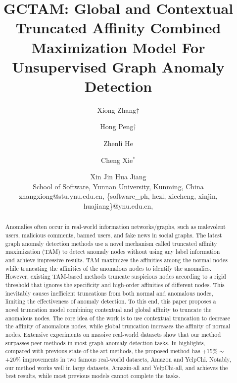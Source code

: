 \documentclass{article}
\title{GCTAM: Global and Contextual Truncated Affinity Combined Maximization Model For Unsupervised Graph Anomaly Detection}
\author{
Xiong Zhang${{\dagger}}$\and
Hong Peng${{\dagger}}$\and
Zhenli He \and
Cheng Xie$^*$\and
Xin Jin \And
Hua Jiang \\
\affiliations
School of Software, Yunnan University,  Kunming,  China\\
\emails
zhangxiong@stu.ynu.edu.cn,
\{software\_ph, hezl, xiecheng, xinjin, huajiang\}@ynu.edu.cn,
}
\begin{document}
\maketitle
\begin{abstract}
Anomalies often occur in real-world information networks/graphs, such as malevolent users, malicious comments,  banned users, and fake news in social graphs. 
The latest graph anomaly detection methods use a novel mechanism called truncated affinity maximization (TAM) to detect anomaly nodes without using any label information and achieve impressive results.
TAM maximizes the affinities among the normal nodes while truncating the affinities of the anomalous nodes to identify the anomalies.
However, existing TAM-based methods truncate suspicious nodes according to a rigid threshold that ignores the specificity and high-order affinities of different nodes.
This inevitably causes inefficient truncations from both normal and anomalous nodes, limiting the effectiveness of anomaly detection. 
To this end, this paper proposes a novel truncation model combining contextual and global affinity to truncate the anomalous nodes.
The core idea of the work is to use contextual truncation to decrease the affinity of anomalous nodes, while global truncation increases the affinity of normal nodes.
Extensive experiments on massive real-world datasets show that our method surpasses peer methods in most graph anomaly detection tasks.
In highlights, compared with previous state-of-the-art methods, the proposed method has +15\% $\sim$ +20\% improvements in two famous real-world datasets, Amazon and YelpChi. 
Notably, our method works well in large datasets, Amazin-all and YelpChi-all, and achieves the best results, while most previous models cannot complete the tasks.  
\end{abstract} 



\end{document}
